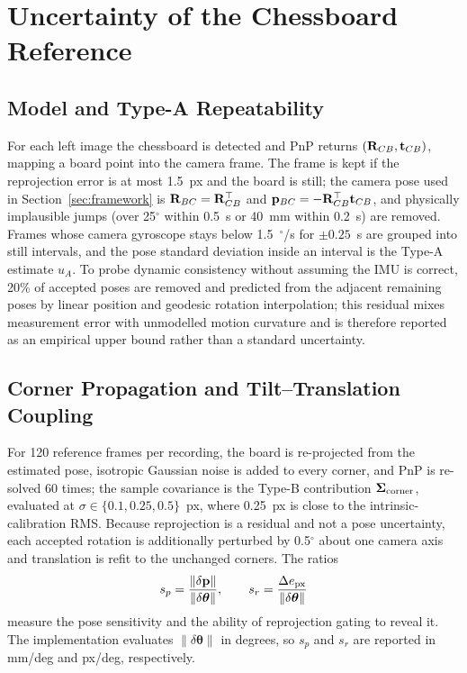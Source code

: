 \section{Uncertainty of the Chessboard Reference}
\label{sec:reference}

\subsection{Model and Type-A Repeatability}
For each left image the chessboard is detected and PnP returns
$({\bf R}_{CB},{\bf t}_{CB})$, mapping a board point into the camera frame.
The frame is kept if the reprojection error is at most 1.5~px and the board is
still; the camera pose used in Section~\ref{sec:framework} is
${\bf R}_{BC}={\bf R}_{CB}^{\top}$ and
${\bf p}_{BC}=-{\bf R}_{CB}^{\top}{\bf t}_{CB}$, and
physically implausible jumps (over 25$^\circ$ within 0.5~s or 40~mm within
0.2~s) are removed. Frames whose camera gyroscope stays below 1.5~$^\circ$/s
for $\pm0.25$~s are grouped into still intervals, and the pose standard
deviation inside an interval is the Type-A estimate $u_A$. To probe dynamic
consistency without assuming the IMU is correct, 20\% of accepted poses are
removed and predicted from the adjacent remaining poses by linear position and
geodesic rotation interpolation; this residual mixes measurement error with
unmodelled motion curvature and is therefore reported as an empirical upper
bound rather than a standard uncertainty.

\subsection{Corner Propagation and Tilt--Translation Coupling}
For 120 reference frames per recording, the board is re-projected from the
estimated pose, isotropic Gaussian noise is added to every corner, and PnP is
re-solved 60 times; the sample covariance is the Type-B contribution
$\boldsymbol\Sigma_{\rm corner}$, evaluated at
$\sigma\in\{0.1,0.25,0.5\}$~px, where 0.25~px is close to the
intrinsic-calibration RMS. Because reprojection is a residual and not a pose
uncertainty, each accepted rotation is additionally perturbed by 0.5$^\circ$
about one camera axis and translation is refit to the unchanged corners. The
ratios
\begin{equation}
 s_p=\frac{\|\delta{\bf p}\|}{\|\delta\boldsymbol\theta\|},\qquad
 s_r=\frac{\Delta e_{\rm px}}{\|\delta\boldsymbol\theta\|}
\end{equation}
measure the pose sensitivity and the ability of reprojection gating to reveal
it. The implementation evaluates $\|\delta\boldsymbol\theta\|$ in degrees, so
$s_p$ and $s_r$ are reported in mm/deg and px/deg, respectively.

